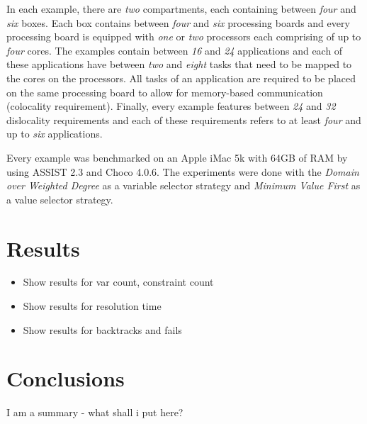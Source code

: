 \documentclass[english,biblatex]{lni}
\begin{document}
In each example, there are \emph{two} compartments, each containing between \emph{four} and \emph{six} boxes.
Each box contains between \emph{four} and \emph{six} processing boards and every processing board is equipped with \emph{one} or \emph{two} processors each comprising of up to \emph{four} cores.
The examples contain between \emph{16} and \emph{24} applications and each of these applications have between \emph{two} and \emph{eight} tasks that need to be mapped to the cores on the processors.
All tasks of an application are required to be placed on the same processing board to allow for memory-based communication (colocality requirement).
Finally, every example features between \emph{24} and \emph{32} dislocality requirements and each of these requirements refers to at least \emph{four} and up to \emph{six} applications.

Every example was benchmarked on an Apple iMac 5k with 64GB of RAM by using ASSIST 2.3 and Choco 4.0.6.
The experiments were done with the \emph{Domain over Weighted Degree} as a variable selector strategy and \emph{Minimum Value First} as a value selector strategy.

\section{Results}

\begin{itemize}
\item Show results for var count, constraint count
\item Show results for resolution time
\item Show results for backtracks and fails
\end{itemize}

\section{Conclusions}

I am a summary - what shall i put here?

\printbibliography[heading=bibintoc]
\end{document}

